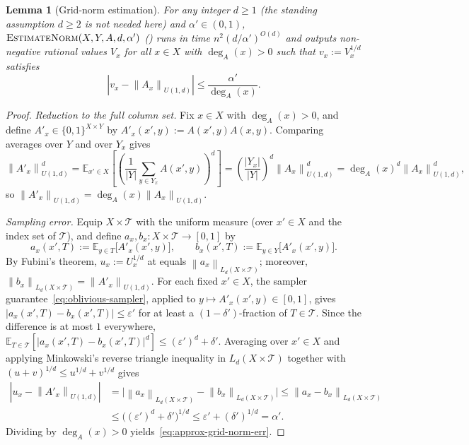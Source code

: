 \documentclass[11pt]{article}
\newtheorem{lemma}[theorem]{Lemma}
\theoremstyle{definition}
\renewcommand{\label}[1]{}%
\newcommand{\E}{\mathbb{E}}
\newcommand{\norm}[1]{\left\lVert #1 \right\rVert}
\newcommand{\abs}[1]{\left\lvert #1 \right\rvert}
\newcommand{\EstimateNorm}{\textnormal{\textsc{EstimateNorm}}}
\begin{document}
\begin{lemma}[Grid-norm estimation]
\label{lem:approx-grid-norm}
For any integer $d \ge 1$ (the standing assumption $d \ge 2$ is not needed here) and $\alpha' \in (0, 1)$, $\EstimateNorm(X, Y, A, d, \alpha')$ () runs in time $n^2 (d / \alpha')^{O(d)}$ and outputs non-negative rational values $V_x$ for all $x \in X$ with $\deg_A(x) > 0$ such that $v_x := V_x^{1/d}$ satisfies
\begin{equation}\label{eq:approx-grid-norm-err}
    \abs{v_x - \norm{A_x}_{U(1, d)}} \le \frac{\alpha'}{\deg_A(x)}.
\end{equation}
\end{lemma}

\begin{proof}
\emph{Reduction to the full column set.} Fix $x \in X$ with $\deg_A(x) > 0$, and define $A'_x \in \{0, 1\}^{X \times Y}$ by $A'_x(x', y) := A(x', y)A(x, y)$. Comparing averages over $Y$ and over $Y_x$ gives
\[
    \norm{A'_x}_{U(1, d)}^d = \E_{x' \in X}\!\left[\left(\frac{1}{\abs{Y}}\sum_{y \in Y_x} A(x', y)\right)^d\right] = \left(\frac{\abs{Y_x}}{\abs{Y}}\right)^d \norm{A_x}_{U(1, d)}^d = \deg_A(x)^d \norm{A_x}_{U(1, d)}^d,
\]
so $\norm{A'_x}_{U(1, d)} = \deg_A(x)\norm{A_x}_{U(1, d)}$.

\emph{Sampling error.} Equip $X \times \mathcal{T}$ with the uniform measure (over $x' \in X$ and the index set of $\mathcal{T}$), and define $a_x, b_x : X \times \mathcal{T} \to [0, 1]$ by
\[
    a_x(x', T) := \E_{y \in T}\big[A'_x(x', y)\big], \qquad b_x(x', T) := \E_{y \in Y}\big[A'_x(x', y)\big].
\]
By Fubini's theorem, $u_x := U_x^{1/d}$ at  equals $\norm{a_x}_{L_d(X \times \mathcal{T})}$; moreover, $\norm{b_x}_{L_d(X \times \mathcal{T})} = \norm{A'_x}_{U(1, d)}$. For each fixed $x' \in X$, the sampler guarantee~\eqref{eq:oblivious-sampler}, applied to $y \mapsto A'_x(x', y) \in [0, 1]$, gives $\abs{a_x(x', T) - b_x(x', T)} \le \varepsilon'$ for at least a $(1 - \delta')$-fraction of $T \in \mathcal{T}$. Since the difference is at most $1$ everywhere, $\E_{T \in \mathcal{T}}[\abs{a_x(x', T) - b_x(x', T)}^d] \le (\varepsilon')^d + \delta'$. Averaging over $x' \in X$ and applying Minkowski's reverse triangle inequality in $L_d(X \times \mathcal{T})$ together with $(u + v)^{1/d} \le u^{1/d} + v^{1/d}$ gives
\begin{align*}
    \abs{u_x - \norm{A'_x}_{U(1, d)}} &= \Big|\norm{a_x}_{L_d(X \times \mathcal{T})} - \norm{b_x}_{L_d(X \times \mathcal{T})}\Big| \le \norm{a_x - b_x}_{L_d(X \times \mathcal{T})} \\
    &\le \big((\varepsilon')^d + \delta'\big)^{1/d} \le \varepsilon' + (\delta')^{1/d} = \alpha'.
\end{align*}
Dividing by $\deg_A(x) > 0$ yields~\eqref{eq:approx-grid-norm-err}.


\end{proof}
\end{document}
